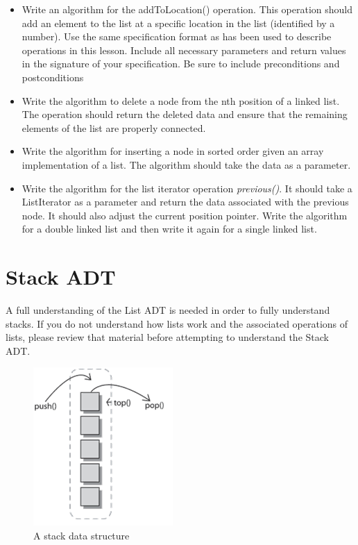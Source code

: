 \begin{itemize}

\item Write an algorithm for the addToLocation() operation.  This operation should add an element to the list at a specific location in the list (identified by a number). Use the same specification format as has been used to describe operations in this lesson. Include all necessary parameters and return values in the signature of your specification. Be sure to include preconditions and postconditions

\item Write the algorithm to delete a node from the nth position of a linked list.  The operation should return the deleted data and  ensure that the remaining elements of the list are properly connected.

\item Write the algorithm for inserting a node in sorted order given an array implementation of a list.   The algorithm should take the data as a parameter.

\item Write the algorithm for the list iterator operation \textit{previous()}.  It should take a ListIterator as a parameter and return the data associated with the previous node.  It should also adjust the current position pointer.   Write the algorithm for a double linked list and then write it again for a single linked list.

\end{itemize}


\chapter{Stack ADT}

    A full understanding of the List ADT is needed in order to fully understand stacks.  If you do not understand how lists work and the associated operations of lists, please review that material before attempting to understand the Stack ADT.
    
    
\begin{figure}[H]
\centering
\includegraphics{pictures/stack.png}
\caption{A stack data structure}
\label{fig:stack}
\end{figure}


